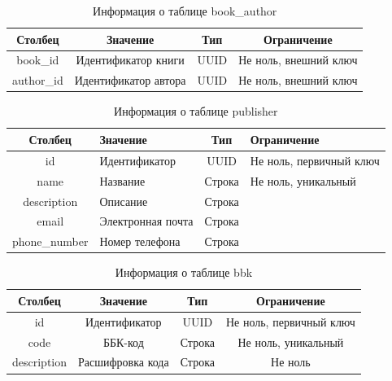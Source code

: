 \begin{table}[H]
    \begin{center}
        \caption{Информация о таблице book\_author}
        \begin{tabular}{|c|c|c|c|}
            \hline
            \textbf{Столбец} & \textbf{Значение} & \textbf{Тип} & \textbf{Ограничение} \\
            \hline
            book\_id & Идентификатор книги & UUID & Не ноль, внешний ключ \\
            \hline
            author\_id & Идентификатор автора & UUID & Не ноль, внешний ключ \\
            \hline
        \end{tabular}
        \label{tbl:book_author}
    \end{center}
\end{table}

\begin{table}[H]
    \begin{center}
        \caption{Информация о таблице publisher}
        \begin{tabular}{|c|p{4cm}|c|p{4cm}|}
            \hline
            \textbf{Столбец} & \textbf{Значение} & \textbf{Тип} & \textbf{Ограничение} \\
            \hline
            id & Идентификатор & UUID & Не ноль, первичный ключ \\
            \hline
            name & Название & Строка & Не ноль, уникальный \\
            \hline
            description & Описание & Строка &  \\
            \hline
            email & Электронная почта & Строка &  \\
            \hline
            phone\_number & Номер телефона & Строка &  \\
            \hline
        \end{tabular}
    \end{center}
\end{table}

\begin{table}[H]
    \begin{center}
        \caption{Информация о таблице bbk}
        \begin{tabular}{|c|c|c|c|}
            \hline
            \textbf{Столбец} & \textbf{Значение} & \textbf{Тип} & \textbf{Ограничение} \\
            \hline
            id & Идентификатор & UUID & Не ноль, первичный ключ \\
            \hline
            code & ББК-код & Строка & Не ноль, уникальный \\
            \hline
            description & Расшифровка кода & Строка & Не ноль \\
            \hline
        \end{tabular}
    \end{center}
\end{table}

